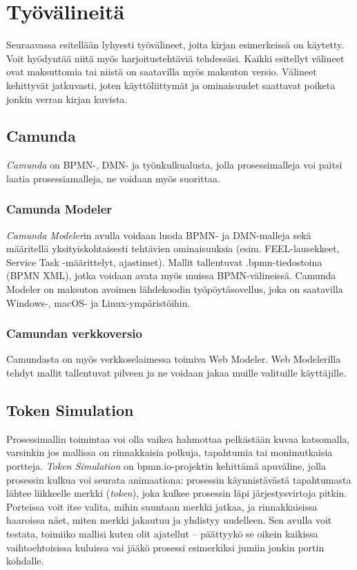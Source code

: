 \documentclass[
  finnish,
  letterpaper,
  DIV=11,
  numbers=noendperiod,
  oneside]{scrreprt}
\begin{document}

\chapter{Työvälineitä}\label{tyuxf6vuxe4lineituxe4}

Seuraavassa esitellään lyhyesti työvälineet, joita kirjan esimerkeissä
on käytetty. Voit hyödyntää niitä myös harjoitustehtäviä tehdessäsi.
Kaikki esitellyt välineet ovat maksuttomia tai niistä on saatavilla myös
maksuton versio. Välineet kehittyvät jatkuvasti, joten käyttöliittymät
ja ominaisuudet saattavat poiketa jonkin verran kirjan kuvista.

\section{Camunda}\label{camunda}

\emph{Camunda} on BPMN-, DMN- ja työnkulkualusta, jolla prosessimalleja
voi paitsi laatia prosessiamalleja, ne voidaan myös suorittaa.

\subsection{Camunda Modeler}\label{camunda-modeler}

\emph{Camunda Modeler}in avulla voidaan luoda BPMN- ja DMN-malleja sekä
määritellä yksityiskohtaisesti tehtävien ominaisuuksia (esim.
FEEL-lausekkeet, Service Task -määrittelyt, ajastimet). Mallit
tallentuvat .bpmn-tiedostoina (BPMN XML), jotka voidaan avata myös
muissa BPMN-välineissä. Camunda Modeler on maksuton avoimen lähdekoodin
työpöytäsovellus, joka on saatavilla Windows-, macOS- ja
Linux-ympäristöihin.

\subsection{Camundan verkkoversio}\label{camundan-verkkoversio}

Camundasta on myös verkkoselaimessa toimiva Web Modeler. Web Modelerilla
tehdyt mallit tallentuvat pilveen ja ne voidaan jakaa muille valituille
käyttäjille.

\section{Token Simulation}\label{token-simulation}

Prosessimallin toimintaa voi olla vaikea hahmottaa pelkästään kuvaa
katsomalla, varsinkin jos mallissa on rinnakkaisia polkuja, tapahtumia
tai monimutkaisia portteja. \emph{Token Simulation} on bpmn.io-projektin
kehittämä apuväline, jolla prosessin kulkua voi seurata animaationa:
prosessin käynnistävästä tapahtumasta lähtee liikkeelle merkki
(\emph{token}), joka kulkee prosessin läpi järjestysvirtoja pitkin.
Porteissa voit itse valita, mihin suuntaan merkki jatkaa, ja
rinnakkaisissa haaroissa näet, miten merkki jakautuu ja yhdistyy
uudelleen. Sen avulla voit testata, toimiiko mallisi kuten olit
ajatellut -- päättyykö se oikein kaikissa vaihtoehtoisissa kuluissa vai
jääkö prosessi esimerkiksi jumiin jonkin portin kohdalle.
\end{document}
